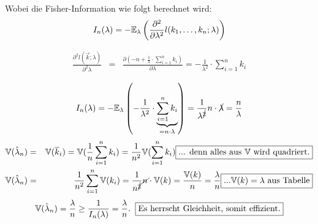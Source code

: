 \begin{uebsp}
\begin{Answer}
\begin{enumerate}[i)]
\begin{uebsp_theory}
            Wobei die Fisher-Information wie folgt berechnet wird:
            \[I_n(\lambda)=-\mathbb E_\lambda\left({\partial^2\over\partial\lambda^2}l(k_1,\dots,k_n;\lambda)\right)\]
        \end{uebsp_theory}
        \begin{eqnarray*}
            \frac{\partial^2 l(\vec k;\lambda)}{\partial^2\lambda}&=&\frac{\partial\left(-n+\frac{1}{\lambda}\cdot\sum_{i=1}^nk_i\right)}{\partial\lambda}=-\frac{1}{\lambda^2}\cdot\sum_{i=1}^nk_i\\
        \end{eqnarray*}
        \[I_n(\lambda)=-\mathbb E_\lambda\left(-\frac{1}{\lambda^2}\cdot\underbrace{\sum_{i=1}^nk_i}_{=n\cdot\lambda}\right)=\frac{1}{\lambda^{\cancel 2}}n\cdot\cancel\lambda=\frac{n}{\lambda}\]
    \begin{eqnarray*}\mathbb V(\hat\lambda_n)&=&\mathbb V(\overline k_i)=\mathbb V(\frac{1}{n}\sum_{i=1}^nk_i)=\frac{1}{n^2}\mathbb V(\sum_{i=1}^nk_i)\framebox{... denn alles aus $\mathbb V$ wird quadriert.}\\
        \mathbb V(\hat\lambda_n) &=& \frac{1}{n^2}\sum_{i=1}^n\mathbb V(k_i)=\frac{1}{n^{\cancel2}}\cancel n\cdot\mathbb V(k)=\frac{\mathbb V(k)}{n}=\frac{\lambda}{n}\framebox{...$\mathbb V(k)=\lambda$ aus Tabelle}
    \end{eqnarray*}
    \[\mathbb V(\hat\lambda_n)=\frac{\lambda}{n}\ge \frac{1}{I_n(\lambda)}={\frac{\lambda}{n}}.\;\;\framebox{Es herrscht Gleichheit, somit effizient.}\]
\end{enumerate}
   
\end{Answer}
\end{uebsp}
